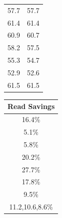 \begin{table}
\begin{tabular}{|c|c|}
    57.7 & 57.7 \\ 
    61.4 & 61.4 \\ 
    60.9 & {\color{red} 60.7} \\ 
    58.2 & {\color{red} 57.5} \\ 
    55.3 & {\color{red} 54.7} \\ 
    52.9 & {\color{red} 52.6} \\
    61.5 & 61.5 \\ 
    \end{tabular}
    \begin{tabular}{|c}
    \\
    Read Savings \\
    \hline
    16.4\%\\ 
    5.1\%\\ 
    5.8\%\\ 
    20.2\%\\ 
    27.7\%\\ 
    17.8\%\\ 
    9.5\% \\
    11.2,10.6,8.6\%\\ 
    \end{tabular}


\end{table}
